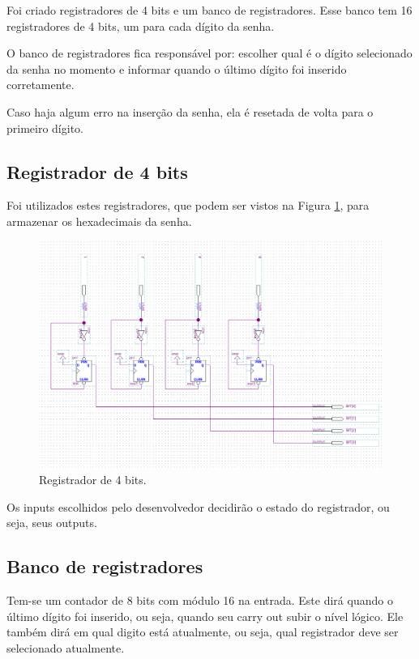 Foi criado registradores de 4 bits e um banco de registradores. Esse banco tem 16 registradores de 4 bits, um para cada dígito da senha.

O banco de registradores fica responsável por: escolher qual é o dígito selecionado da senha no momento e informar quando o último dígito foi inserido corretamente.

Caso haja algum erro na inserção da senha, ela é resetada de volta para o primeiro dígito.

\subsection{Registrador de 4 bits}

Foi utilizados estes registradores, que podem ser vistos na Figura \ref{fig:2.15}, para armazenar os hexadecimais da senha.


\begin{figure}[H]
	\centering
	\includegraphics[width=1\columnwidth]{FIGURAS/cap_2/registrador.png}
	\caption{Registrador de 4 bits.}
        \label{fig:2.15}
\end{figure}

Os inputs escolhidos pelo desenvolvedor decidirão o estado do registrador, ou seja, seus outputs.

\subsection{Banco de registradores}

Tem-se um contador de 8 bits com módulo 16 na entrada. Este dirá quando o último dígito foi inserido, ou seja, quando seu carry out subir o nível lógico. Ele também dirá em qual digito está atualmente, ou seja, qual registrador deve ser selecionado atualmente.

